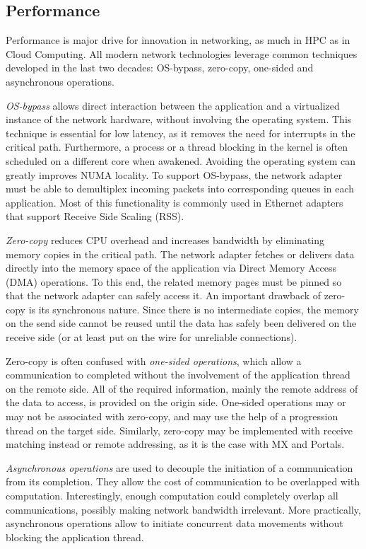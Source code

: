\subsection{Performance}
Performance is major drive for innovation in networking, as much in HPC as 
in Cloud Computing. All modern network technologies leverage common techniques 
developed in the last two decades: OS-bypass, zero-copy, one-sided and asynchronous operations.

\emph{OS-bypass} allows direct interaction between the application and 
a virtualized instance of the network hardware, without involving the 
operating system. 
This technique is essential for low latency, as it removes the need for 
interrupts in the critical path. Furthermore, a process or a thread blocking 
in the kernel is often scheduled on a different core when awakened. Avoiding the 
operating system can greatly improves NUMA locality. 
To support OS-bypass, the network adapter must be able to demultiplex incoming 
packets into corresponding queues in each application. Most of this 
functionality is commonly used in Ethernet adapters that support Receive Side 
Scaling (RSS).

\emph{Zero-copy} reduces CPU overhead and increases bandwidth by eliminating 
memory copies in the critical path. The network adapter fetches or delivers 
data directly into the memory space of the application via Direct Memory Access 
(DMA) operations. To this end, the related memory pages must be pinned so 
that the network adapter can safely access it. 
An important drawback of zero-copy is its synchronous nature. Since there is 
no intermediate copies, the memory on the send side cannot be reused until 
the data has safely been delivered on the receive side (or at least put on 
the wire for unreliable connections).

Zero-copy is often confused with \emph{one-sided operations}, which allow a 
communication to completed without the involvement of the application thread 
on the remote side. All of the required information, mainly the remote address 
of the data to access, is provided on the origin side. One-sided operations 
may or may not be associated with zero-copy, and may use the help of a 
progression thread on the target side. Similarly, zero-copy may be implemented 
with receive matching instead or remote addressing, as it is the case with MX 
and Portals.

\emph{Asynchronous operations} are used to decouple the initiation of a 
communication from its completion. They allow the cost of communication to be 
overlapped with computation. Interestingly, enough computation could completely 
overlap all communications, possibly making network bandwidth irrelevant. 
More practically, asynchronous operations allow to initiate concurrent 
data movements without blocking the application thread.

